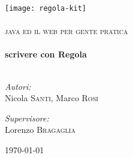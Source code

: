 \begin{titlepage}
 
\begin{center}
 
 
\texttt{[image: regola-kit]}\\[1cm]
 
\textsc{\LARGE }\\[1.5cm]
 
\textsc{\Large java ed il web per gente pratica }\\[0.5cm]
 
\HRule \\[0.4cm]
{ \huge \bfseries scrivere con Regola}\\[0.4cm]
 
\HRule \\[1.5cm]

 
\begin{minipage}{0.4\textwidth}
\begin{flushleft} \large
\emph{Autori:}\\
Nicola \textsc{Santi}, Marco \textsc{Rosi}
\end{flushleft}
\end{minipage}
\begin{minipage}{0.4\textwidth}
\begin{flushright} \large
\emph{Supervisore:} \\
Lorenzo \textsc{Bragaglia}
\end{flushright} 
\end{minipage}
 
\vfill
 
{\large \today}
 
\end{center}
 
\end{titlepage}
